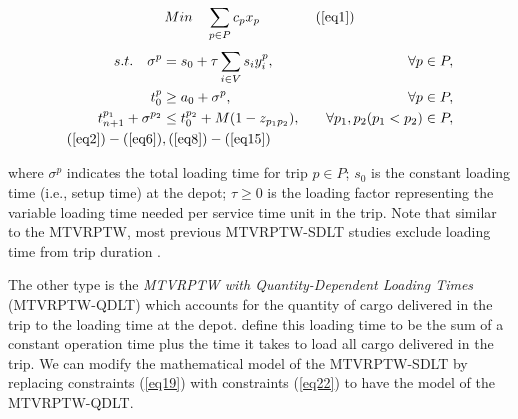 \documentclass[11pt]{article}
\begin{document}
\begin{spreadlines}{14pt} %
\allowdisplaybreaks
\begin{align} 
Min &\quad \sum_{p \in P} c_p x_p &\quad
\tag{\ref{eq1}}
\end{align}
\begin{align}
    s.t. \quad \sigma^p &= s_0 + \tau \sum_{i \in V} s_i y^p_i, & \quad \forall p \in P,
\label{eq19} \\
    t^p_0 &\geq a_0 + \sigma^p, & \quad \forall p \in P,
\label{eq20} \\
    t^{p_1}_{n + 1} + \sigma^{p_2} &\leq t^{p_2}_0 + M(1 - z_{{p_1}{p_2}}), & \quad \forall p_1, p_2 (p_1 < p_2) \in P,
\label{eq21} \\
(\ref{eq2})-(\ref{eq6})&, (\ref{eq8})-(\ref{eq15}) \nonumber
\end{align}
\end{spreadlines}

where $\sigma^p$ indicates the total loading time for trip $p \in P$; $s_0$ is the constant loading time (i.e., setup time) at the depot; $\tau \geq 0$ is the loading factor representing the variable loading time needed per service time unit in the trip.  Note that similar to the MTVRPTW, most previous MTVRPTW-SDLT studies exclude loading time from trip duration \citep[e.g.,][]{macedo2011solving, hernandez2014new}.
\newline



The other type is the \textit{MTVRPTW with Quantity-Dependent Loading Times} (MTVRPTW-QDLT) which accounts for the quantity of cargo delivered in the trip to the loading time at the depot.  \cite{battarra2009adaptive} define this loading time to be the sum of a constant operation time plus the time it takes to load all cargo delivered in the trip.  We can modify the mathematical model of the MTVRPTW-SDLT by replacing constraints (\ref{eq19}) with constraints (\ref{eq22}) to have the model of the MTVRPTW-QDLT.
\end{document}
